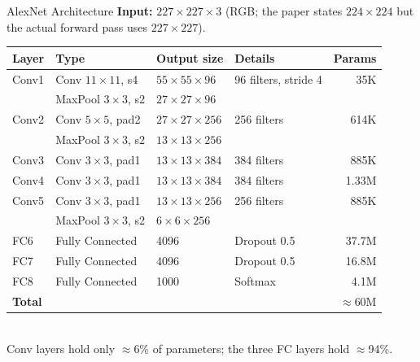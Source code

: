 \documentclass[11pt,a4paper]{article}
\begin{document}
\begin{defbox}{AlexNet Architecture}
\textbf{Input:} $227\times227\times3$ (RGB; the paper states $224\times224$ but the actual forward pass uses $227\times227$).\\[4pt]
\begin{tabular}{@{}llllr@{}}
\toprule
\textbf{Layer} & \textbf{Type} & \textbf{Output size} & \textbf{Details} & \textbf{Params} \\
\midrule
Conv1 & Conv $11\times11$, s4 & $55\times55\times96$  & 96 filters, stride 4 & 35K \\
      & MaxPool $3\times3$, s2 & $27\times27\times96$  & & \\
Conv2 & Conv $5\times5$, pad2  & $27\times27\times256$ & 256 filters & 614K \\
      & MaxPool $3\times3$, s2 & $13\times13\times256$ & & \\
Conv3 & Conv $3\times3$, pad1  & $13\times13\times384$ & 384 filters & 885K \\
Conv4 & Conv $3\times3$, pad1  & $13\times13\times384$ & 384 filters & 1.33M \\
Conv5 & Conv $3\times3$, pad1  & $13\times13\times256$ & 256 filters & 885K \\
      & MaxPool $3\times3$, s2 & $6\times6\times256$   & & \\
FC6   & Fully Connected        & 4096 & Dropout 0.5 & 37.7M \\
FC7   & Fully Connected        & 4096 & Dropout 0.5 & 16.8M \\
FC8   & Fully Connected        & 1000 & Softmax & 4.1M \\
\midrule
\multicolumn{4}{l}{\textbf{Total}} & $\approx$60M \\
\bottomrule
\end{tabular}\\[6pt]
Conv layers hold only $\approx$6\% of parameters; the three FC layers hold $\approx$94\%.
\end{defbox}
\end{document}
